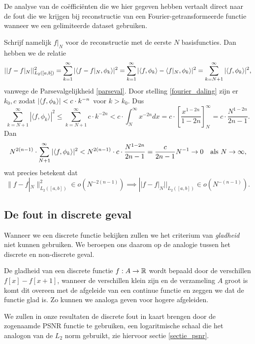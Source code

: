 De analyse van de co\"effici\"enten die we hier gegeven hebben vertaalt direct naar de fout die we krijgen
bij reconstructie van een Fourier-getransformeerde functie wanneer we een gelimiteerde dataset gebruiken.

\begin{gevolg}
Schrijf namelijk $f|_{N}$ voor de reconstructie met de eerste $N$ basisfuncties. Dan hebben we de relatie
\[
  || f - f|_N||^2_{L_2([a,b])} = \sum_{k=1}^\infty |\langle f-f|_N , \phi_k \rangle|^2 = \sum_{k=1}^\infty |\langle f , \phi_k \rangle 
  - \langle f|_N , \phi_k \rangle|^2 = \sum_{k=N+1}^\infty |\langle f , \phi_k \rangle|^2,
\]
vanwege de Parsevalgelijkheid \ref{parseval}. Door stelling \ref{fourier_daling} zijn er $k_0, c$ zodat ${\left| \langle f , \phi_k \rangle \right|} < c\cdot k^{-n}$ voor $k > k_0$. Dus
\[
	\sum_{k=N+1}^\infty | \langle f, \phi_{k} \rangle |^2 \leq \sum_{k=N+1}^\infty c \cdot k^{-2n} < c \cdot \int_{N}^\infty x^{-2n} dx = c \cdot \left[ \frac{x^{1-2n}}{1-2n} \right]^\infty_N = c \cdot \frac{N^{1-2n}}{2n-1}.
\]
Dan
\[
N^{2(n-1)} \cdot \sum_{N+1}^\infty |\langle f , \phi_k \rangle|^2 < N^{2(n-1)} \cdot c \cdot \frac{N^{1-2n}}{2n-1} = \frac{c}{2n-1} N^{-1} \to 0 \quad \text{als } N\to\infty,
\]
wat precies betekent dat
\[
\|f-f|_{N}\|^2_{L_2([a,b])} \in o\left ( N^{-2(n-1)} \right) 
\implies ||f - f|_{N}||_{L_2([a,b])} \in o\left(N^{-(n-1)}\right).
\]
\end{gevolg}

\subsection{De fout in discrete geval}
Wanneer we een discrete functie bekijken zullen we het criterium van \emph{gladheid} niet kunnen gebruiken.
We beroepen ons daarom op de analogie tussen het discrete en non-discrete geval.

De gladheid van een discrete functie $f:A\to\mathbb{R}$ wordt bepaald door de verschillen $f[x]-f[x+1]$,
wanneer de verschillen klein zijn en de verzameling $A$ groot is komt dit overeen met de afgeleide van een 
continue functie en zeggen we dat de functie glad is. Zo kunnen we analoga geven voor hogere afgeleiden.

We zullen in onze resultaten de discrete fout in kaart brengen door de zogenaamde PSNR functie te gebruiken,
een logaritmische schaal die het analogon van de $L_2$ norm gebruikt, zie hiervoor sectie \ref{sectie_psnr}.

